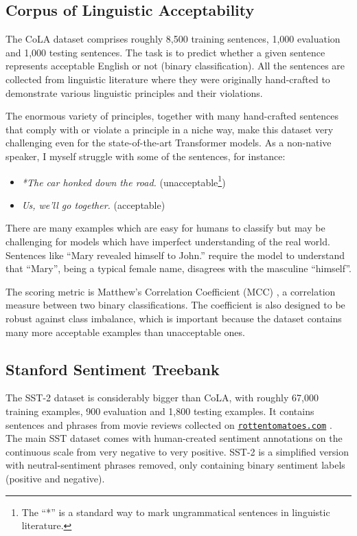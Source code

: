 \documentclass[bsc,frontabs,singlespacing,parskip,deptreport]{infthesis}
\newcommand\rurl[1]{%
  \href{https://#1}{\nolinkurl{#1}}%
}
\begin{document}
{{    \subsection{Corpus of Linguistic Acceptability}{
      \label{sec:datasets-CoLA}

      The CoLA dataset \citep{CoLA-paper} comprises roughly 8,500 training sentences, 1,000 evaluation and 1,000 testing sentences.
      The task is to predict whether a given sentence represents acceptable English or not (binary classification).
      All the sentences are collected from linguistic literature where they were originally hand-crafted to demonstrate various linguistic principles and their violations.
      
      The enormous variety of principles, together with many hand-crafted sentences that comply with or violate a principle in a niche way, make this dataset very challenging even for the state-of-the-art Transformer models. 
      As a non-native speaker, I myself struggle with some of the sentences, for instance:
      \begin{itemize}
        \item \textit{*The car honked down the road.} (unacceptable\footnote{The ``*'' is a standard way to mark ungrammatical sentences in linguistic literature.})
        \item \textit{Us, we'll go together.} (acceptable)
      \end{itemize}

      There are many examples which are easy for humans to classify but may be challenging for models which have imperfect understanding of the real world. Sentences like ``Mary revealed himself to John.'' require the model to understand that ``Mary'', being a typical female name, disagrees with the masculine ``himself''.
      
      The scoring metric is Matthew's Correlation Coefficient (MCC) \citep{Matthews_1975}, a correlation measure between two binary classifications. The coefficient is also designed to be robust against class imbalance, which is important because the dataset contains many more acceptable examples than unacceptable ones.
    }

    \subsection{Stanford Sentiment Treebank}{
      \label{sec:datasets-SST-2}

      The SST-2 dataset \citep{SST-paper} is considerably bigger than CoLA, with roughly 67,000 training examples, 900 evaluation and 1,800 testing examples. It contains sentences and phrases from movie reviews collected on \rurl{rottentomatoes.com}. The main SST dataset comes with human-created sentiment annotations on the continuous scale from very negative to very positive. SST-2 is a simplified version with neutral-sentiment phrases removed, only containing binary sentiment labels (positive and negative).

}}}
\end{document}
